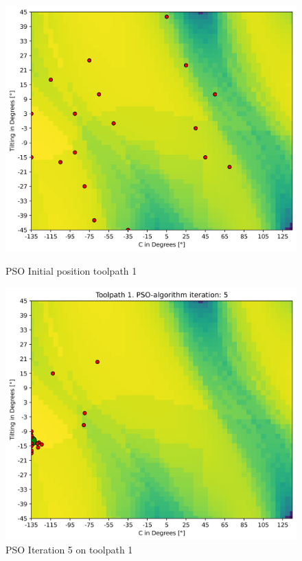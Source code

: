 \begin{figure}[H]	
	\centering
	\begin{minipage}{0.5\textwidth}
		\includegraphics[width=\textwidth]{figures/swarm_true/1_0.png}
		\caption{PSO Initial position toolpath 1}
		\label{tp1_0}
	\end{minipage}\hfill
	\begin{minipage}{0.5\textwidth}
		\includegraphics[width=\textwidth]{figures/swarm_true/1_5.png}
		\caption{PSO Iteration 5 on toolpath 1}
		\label{tp1_5}
	\end{minipage}\par
\end{figure}


